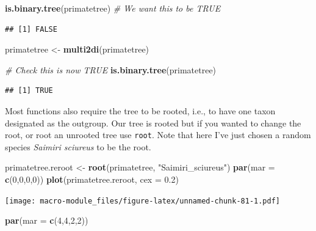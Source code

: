 \documentclass[]{book}
\newenvironment{Shaded}{\begin{snugshade}}{\end{snugshade}}
\newcommand{\KeywordTok}[1]{\textcolor[rgb]{0.13,0.29,0.53}{\textbf{{#1}}}}
\newcommand{\DataTypeTok}[1]{\textcolor[rgb]{0.13,0.29,0.53}{{#1}}}
\newcommand{\DecValTok}[1]{\textcolor[rgb]{0.00,0.00,0.81}{{#1}}}
\newcommand{\FloatTok}[1]{\textcolor[rgb]{0.00,0.00,0.81}{{#1}}}
\newcommand{\StringTok}[1]{\textcolor[rgb]{0.31,0.60,0.02}{{#1}}}
\newcommand{\CommentTok}[1]{\textcolor[rgb]{0.56,0.35,0.01}{\textit{{#1}}}}
\newcommand{\NormalTok}[1]{{#1}}
\theoremstyle{definition}
\theoremstyle{definition}
\theoremstyle{definition}
\theoremstyle{remark}
\begin{document}
\begin{Shaded}
\begin{Highlighting}[]
\KeywordTok{is.binary.tree}\NormalTok{(primatetree) }\CommentTok{# We want this to be TRUE}
\end{Highlighting}
\end{Shaded}

\begin{verbatim}
## [1] FALSE
\end{verbatim}

\begin{Shaded}
\begin{Highlighting}[]
\NormalTok{primatetree <-}\StringTok{ }\KeywordTok{multi2di}\NormalTok{(primatetree)}

\CommentTok{# Check this is now TRUE}
\KeywordTok{is.binary.tree}\NormalTok{(primatetree)}
\end{Highlighting}
\end{Shaded}

\begin{verbatim}
## [1] TRUE
\end{verbatim}

Most functions also require the tree to be rooted, i.e., to have one
taxon designated as the outgroup. Our tree is rooted but if you wanted
to change the root, or root an unrooted tree use \texttt{root}. Note
that here I've just chosen a random species \emph{Saimiri sciureus} to
be the root.

\begin{Shaded}
\begin{Highlighting}[]
\NormalTok{primatetree.reroot <-}\StringTok{ }\KeywordTok{root}\NormalTok{(primatetree, }\StringTok{"Saimiri_sciureus"}\NormalTok{)}
\KeywordTok{par}\NormalTok{(}\DataTypeTok{mar =} \KeywordTok{c}\NormalTok{(}\DecValTok{0}\NormalTok{,}\DecValTok{0}\NormalTok{,}\DecValTok{0}\NormalTok{,}\DecValTok{0}\NormalTok{))}
\KeywordTok{plot}\NormalTok{(primatetree.reroot, }\DataTypeTok{cex =} \FloatTok{0.2}\NormalTok{)}
\end{Highlighting}
\end{Shaded}

\texttt{[image: macro-module\_files/figure-latex/unnamed-chunk-81-1.pdf]}

\begin{Shaded}
\begin{Highlighting}[]
\KeywordTok{par}\NormalTok{(}\DataTypeTok{mar =} \KeywordTok{c}\NormalTok{(}\DecValTok{4}\NormalTok{,}\DecValTok{4}\NormalTok{,}\DecValTok{2}\NormalTok{,}\DecValTok{2}\NormalTok{))}
\end{Highlighting}
\end{Shaded}
\end{document}
